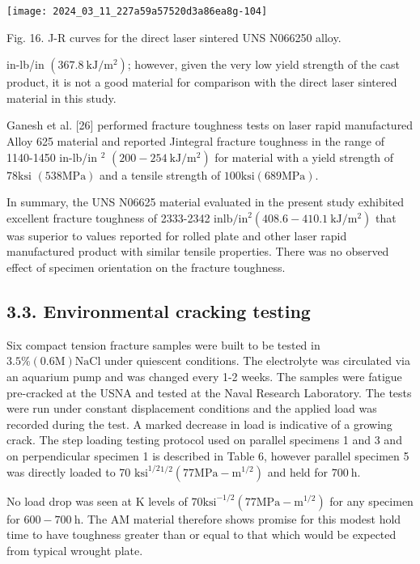 \documentclass[10pt]{article}
\begin{document}
\begin{center}
\texttt{[image: 2024\_03\_11\_227a59a57520d3a86ea8g-104]}
\end{center}

Fig. 16. J-R curves for the direct laser sintered UNS N066250 alloy.

in-lb/in $\left(367.8 \mathrm{~kJ} / \mathrm{m}^{2}\right)$; however, given the very low yield strength of the cast product, it is not a good material for comparison with the direct laser sintered material in this study.

Ganesh et al. [26] performed fracture toughness tests on laser rapid manufactured Alloy 625 material and reported Jintegral fracture toughness in the range of 1140-1450 in-lb/in ${ }^{2}$ $\left(200-254 \mathrm{~kJ} / \mathrm{m}^{2}\right)$ for material with a yield strength of $78 \mathrm{ksi}$ $(538 \mathrm{MPa})$ and a tensile strength of $100 \mathrm{ksi}(689 \mathrm{MPa})$.

In summary, the UNS N06625 material evaluated in the present study exhibited excellent fracture toughness of 2333-2342 in$\mathrm{lb} / \mathrm{in}^{2}\left(408.6-410.1 \mathrm{~kJ} / \mathrm{m}^{2}\right)$ that was superior to values reported for rolled plate and other laser rapid manufactured product with similar tensile properties. There was no observed effect of specimen orientation on the fracture toughness.

\subsection*{3.3. Environmental cracking testing}
Six compact tension fracture samples were built to be tested in $3.5 \%(0.6 \mathrm{M}) \mathrm{NaCl}$ under quiescent conditions. The electrolyte was circulated via an aquarium pump and was changed every 1-2 weeks. The samples were fatigue pre-cracked at the USNA and tested at the Naval Research Laboratory. The tests were run under constant displacement conditions and the applied load was recorded during the test. A marked decrease in load is indicative of a growing crack. The step loading testing protocol used on parallel specimens 1 and 3 and on perpendicular specimen 1 is described in Table 6, however parallel specimen 5 was directly loaded to 70 $\mathrm{ksi}^{1 / 2}{ }^{1 / 2}\left(77 \mathrm{MPa}-\mathrm{m}^{1 / 2}\right)$ and held for $700 \mathrm{~h}$.

No load drop was seen at $\mathrm{K}$ levels of $70 \mathrm{ksi}^{-1 / 2}\left(77 \mathrm{MPa}-\mathrm{m}^{1 / 2}\right)$ for any specimen for $600-700 \mathrm{~h}$. The AM material therefore shows promise for this modest hold time to have toughness greater than or equal to that which would be expected from typical wrought plate.
\end{document}
